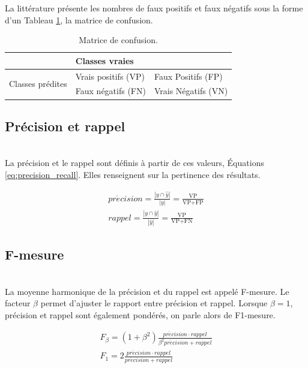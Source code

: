 La littérature présente les nombres de faux positifs et faux négatifs sous la forme d'un Tableau \ref{tab:confusion_matrix}, la matrice de confusion.

\begin{table}[]
	\centering
	\begin{tabular}{l|l|l|}
		\cline{2-3}
		& \multicolumn{2}{l|}{Classes vraies}               \\ \hline
		\multicolumn{1}{|l|}{\multirow{2}{*}{Classes prédites}} & Vrais positifs (VP) & Faux Positifs (FP)  \\ \cline{2-3} 
		\multicolumn{1}{|l|}{}                            & Faux négatifs (FN)  & Vrais Négatifs (VN) \\ \hline
	\end{tabular}
	\caption{Matrice de confusion.}
	\label{tab:confusion_matrix}
\end{table}

\subsection{Précision et rappel}\mbox{} \\
La précision et le rappel sont définis à partir de ces valeurs, Équations \ref{eq:precision_recall}.
Elles renseignent sur la pertinence des résultats.

\begin{equation} \label{eq:precision_recall}
\begin{split}
pr\acute{e}cision = \frac{|y \cap \hat{y}|}{|y|} = \frac{\text{VP}}{\text{VP}+\text{FP}}
\\
rappel = \frac{|y \cap \hat{y}|}{|\hat{y}|} = \frac{\text{VP}}{\text{VP}+\text{FN}}
\end{split}
\end{equation}

\subsection{F-mesure}\mbox{} \\
La moyenne harmonique de la précision et du rappel est appelé F-mesure.
Le facteur $\beta$ permet d'ajuster le rapport entre précision et rappel.
Lorsque $\beta = 1$, précision et rappel sont également pondérés, on parle alors de F1-mesure.

\begin{equation} \label{eq:f1_score}
\begin{split}
F_{\beta}=\left(1+\beta^{2}\right) \frac{pr\acute{e}cision \cdot rappel}{\beta^{2} pr\acute{e}cision + rappel}
\\
F_{1}= 2 \frac{pr\acute{e}cision \cdot rappel}{pr\acute{e}cision + rappel}
\end{split}
\end{equation}

